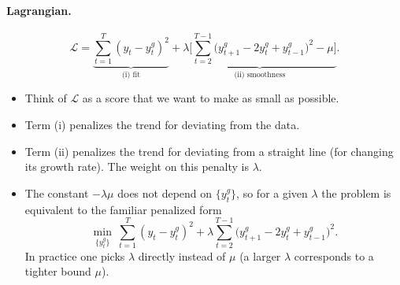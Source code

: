 \paragraph{Lagrangian.}
\begin{equation}\label{eq:s6_hpL}
\mathcal L=\underbrace{\sum_{t=1}^{T}(y_t-y_t^g)^2}_{\text{(i) fit}}
+\underbrace{\lambda\Big[\sum_{t=2}^{T-1}\big(y_{t+1}^g-2y_t^g+y_{t-1}^g\big)^2-\mu\Big]}_{\text{(ii) smoothness}} .
\end{equation}
\begin{itemize}
  \item Think of $\mathcal L$ as a score that we want to make as small as possible.
  \item Term (i) penalizes the trend for deviating from the data.
  \item Term (ii) penalizes the trend for deviating from a straight line (for changing its growth rate). The weight on this penalty is $\lambda$.
  \item The constant $-\lambda\mu$ does not depend on $\{y_t^g\}$, so for a given $\lambda$ the problem is equivalent to the familiar penalized form
  \[
  \min_{\{y_t^g\}}\ \sum_{t=1}^{T}(y_t-y_t^g)^2+\lambda\sum_{t=2}^{T-1}\big(y_{t+1}^g-2y_t^g+y_{t-1}^g\big)^2 .
  \]
  In practice one picks $\lambda$ directly instead of $\mu$ (a larger $\lambda$ corresponds to a tighter bound $\mu$).
\end{itemize}

